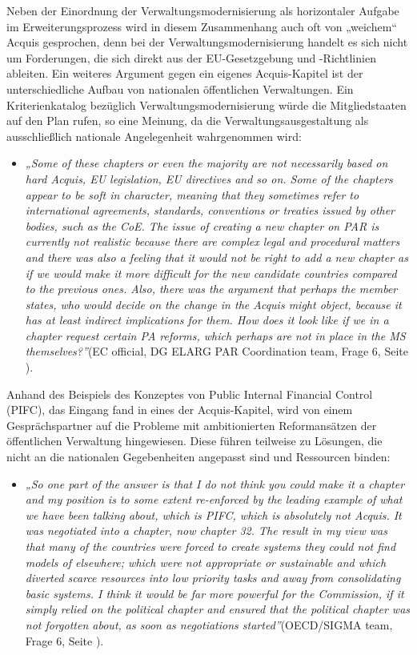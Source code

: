 Neben der Einordnung der Verwaltungsmodernisierung als horizontaler Aufgabe im Erweiterungsprozess wird in diesem Zusammenhang auch oft von „weichem“ Acquis gesprochen, denn bei der Verwaltungsmodernisierung handelt es sich nicht um Forderungen, die sich direkt aus der EU-Gesetzgebung und -Richtlinien ableiten. 
Ein weiteres Argument gegen ein eigenes Acquis-Kapitel ist der unterschiedliche Aufbau von nationalen öffentlichen Verwaltungen. Ein Kriterienkatalog bezüglich Verwaltungsmodernisierung würde die Mitgliedstaaten auf den Plan rufen, so eine Meinung, da die Verwaltungsausgestaltung als ausschließlich nationale Angelegenheit wahrgenommen wird:
\begin{itemize}[label={}]
\item \textit{„Some of these chapters or even the majority are not necessarily based on hard Acquis, EU legislation, EU directives and so on. Some of the chapters appear to be soft in character, meaning that they sometimes refer to international agreements, standards, conventions or treaties issued by other bodies, such as the CoE. The issue of creating a new chapter on PAR is currently not realistic because there are complex legal and procedural matters and there was also a feeling that it would not be right to add a new chapter as if we would make it more difficult for the new candidate countries compared to the previous ones. Also, there was the argument that perhaps the member states, who would decide on the change in the Acquis might object, because it has at least indirect implications for them. How does it look like if we in a chapter request certain PA reforms, which perhaps are not in place in the MS themselves?”}(EC official, DG ELARG PAR Coordination team, Frage 6, Seite \pageref{sec:chapter}).
\end{itemize}

Anhand des Beispiels des Konzeptes von Public Internal Financial Control (PIFC), das Eingang fand in eines der Acquis-Kapitel, wird von einem Gesprächspartner auf die Probleme mit ambitionierten Reformansätzen der öffentlichen Verwaltung hingewiesen. Diese führen teilweise zu Lösungen, die nicht an die nationalen Gegebenheiten angepasst sind und Ressourcen binden:
\begin{itemize}[label={}]
\item \textit{„So one part of the answer is that I do not think you could make it a chapter and my position is to some extent re-enforced by the leading example of what we have been talking about, which is PIFC, which is absolutely not Acquis. It was negotiated into a chapter, now chapter 32. The result in my view was that many of the countries were forced to create systems they could not find models of elsewhere; which were not appropriate or sustainable and which diverted scarce resources into low priority tasks and away from consolidating basic systems. I think it would be far more powerful for the Commission, if it simply relied on the political chapter and ensured that the political chapter was not forgotten about, as soon as negotiations started”}(OECD/SIGMA team, Frage 6, Seite \pageref{sec:chapter}).
\end{itemize}

